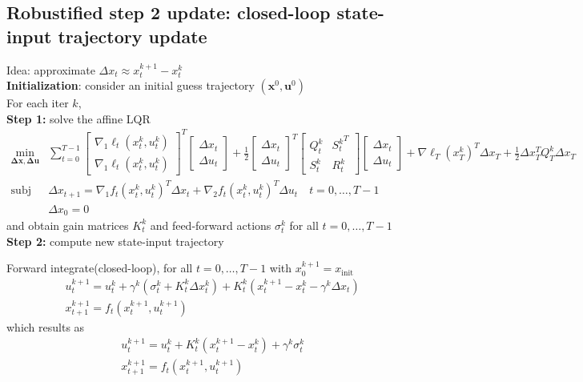\documentclass[openany]{book}
\theoremstyle{definition}
\theoremstyle{remark}
\begin{document}
\subsection{Robustified step 2 update: closed-loop state-input trajectory update}
Idea: approximate $\Delta x_t \approx x_t^{k+1}-x_t^k$\\ 
\textbf{Initialization}: consider an initial guess trajectory $(\mathbf{x}^0,\mathbf{u}^0)$\\
For each iter $k$, \\
\textbf{Step 1:} solve the affine LQR
\begin{align*}
    \min_{\mathbf{\Delta x, \Delta u}}  &\displaystyle\sum_{t=0}^{T-1}\begin{bmatrix}
        \nabla_1\ell_t(x_t^k,u_t^k)\\
        \nabla_1\ell_t(x_t^k,u_t^k)
    \end{bmatrix}^T \begin{bmatrix}
        \Delta x_t \\ \Delta u_t
    \end{bmatrix} + \displaystyle\frac{1}{2}\begin{bmatrix}
        \Delta x_t \\ \Delta u_t
    \end{bmatrix}^T \begin{bmatrix}
        Q_t^k & {S_t^k}^T \\ S_t^k & R_t^k
    \end{bmatrix}\begin{bmatrix}
        \Delta x_t \\ \Delta u_t
    \end{bmatrix} 
     + \nabla\ell_T(x_T^k)^T\Delta x_T + \displaystyle\frac{1}{2}\Delta x_T^TQ_T^k\Delta x_T\\
    \text{subj to } & \Delta x_{t+1} = \nabla_1f_t(x_t^k,u_t^k)^T\Delta x_t + \nabla_2f_t(x_t^k,u_t^k)^T\Delta u_t \quad t=0,\dots,T-1 \\ 
    & \Delta x_0 = 0
\end{align*}
and obtain gain matrices $K_t^k$ and feed-forward actions $\sigma_t^k$ for all $t=0,\dots,T-1$\\ 
\textbf{Step 2:} compute new state-input trajectory 

Forward integrate(closed-loop), for all $t=0,\dots,T-1$ with $x_0^{k+1}=x_{\text{init}}$
\begin{align*}
    &u_t^{k+1} = u_t^k + \gamma^k(\sigma_t^k + K_t^k\Delta x_t^k) + K_t^k(x_t^{k+1}-x_t^k - \gamma^k\Delta x_t)\\ 
    & x_{t+1}^{k+1} = f_t(x_t^{k+1},u_t^{k+1})
\end{align*}
which results as 
\begin{align*}
    &u_t^{k+1} = u_t^k + K_t^k(x_t^{k+1}-x_t^k ) + \gamma^k\sigma_t^k  \\ 
    & x_{t+1}^{k+1} = f_t(x_t^{k+1},u_t^{k+1})
\end{align*}
\end{document}
